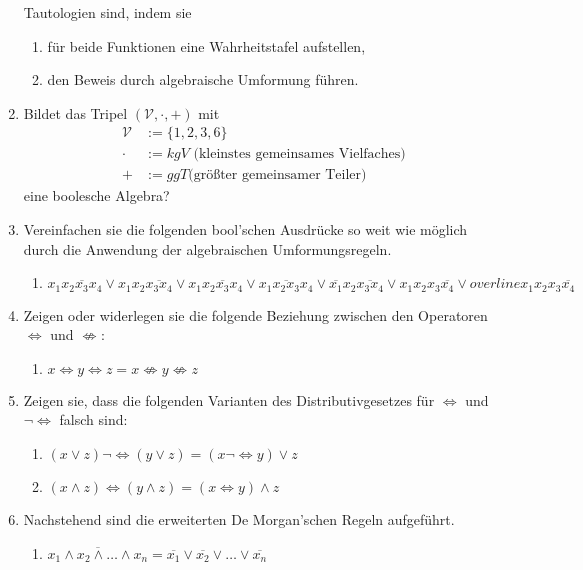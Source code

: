 \documentclass[paper=a4,fontsize=11pt]{scrartcl}%
\numberwithin{equation}{section}
\begin{document}
\begin{enumerate}
	Tautologien sind, indem sie
	\begin{enumerate}
		\item für beide Funktionen eine Wahrheitstafel aufstellen,
		\item den Beweis durch algebraische Umformung führen.
	\end{enumerate}
	\item Bildet das Tripel $( \mathcal{V}, \cdot, +)$ mit
	\begin{align*}
		\mathcal{V} & := \{1,2,3,6\}\\
		\cdot 		& := kgV \text{ (kleinstes gemeinsames Vielfaches)}\\
		+ 			& := ggT \text{(größter gemeinsamer Teiler)}
	\end{align*}	
	eine boolesche Algebra?
	\item Vereinfachen sie die folgenden bool'schen Ausdrücke so weit wie möglich durch die Anwendung der algebraischen Umformungsregeln.
	\begin{enumerate}
		\item $ x_1 \overline{x_2 x_3 x_4} \lor x_1 x_2 \overline{x_3 x_4} \lor x_1 x_2 \overline{x_3} x_4 \lor x_1 \overline{x_2 x_3} x_4 \lor \overline{x_1} x_2 \overline{x_3 x_4} \lor x_1 x_2 x_3 \overline{x_4} \lor overline{x_1} x_2 x_3 \overline{x_4}$
	\end{enumerate}
	\item Zeigen oder widerlegen sie die folgende Beziehung zwischen den Operatoren $\Leftrightarrow$ und $\not\Leftrightarrow$:
	\begin{enumerate}
		\item $x \Leftrightarrow y \Leftrightarrow z = x \not\Leftrightarrow y \not\Leftrightarrow z$
	\end{enumerate}
	\item Zeigen sie, dass die folgenden Varianten des Distributivgesetzes für $\Leftrightarrow$ und $\neg \Leftrightarrow$ falsch sind:
	\begin{enumerate}[resume]
		\item $(x \lor z) \neg \Leftrightarrow (y \lor z) = (x \neg \Leftrightarrow y) \lor z$
		\item $(x \land z) \Leftrightarrow (y \land z) = (x \Leftrightarrow y) \land z$
	\end{enumerate}
	\item Nachstehend sind die erweiterten De Morgan'schen Regeln aufgeführt.
	\begin{enumerate}
		\item $\overline{x_1 \land x_2 \land \ldots \land x_n} = \overline{x_1} \lor \overline{x_2} \lor \ldots \lor \overline{x_n}$

\end{enumerate}
\end{enumerate}
\end{document}
